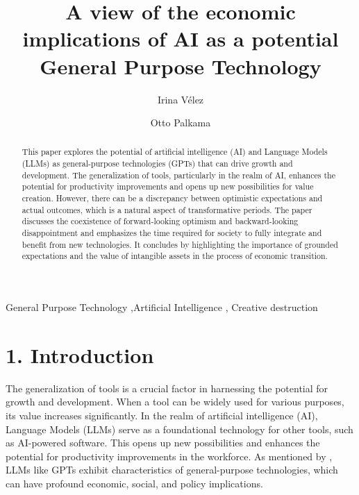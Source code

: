 \documentclass[preprint, 3p,
authoryear]{elsarticle} %
\begin{document}
\begin{frontmatter}

  \title{A view of the economic implications of AI as a potential
General Purpose Technology}
    \author[University of Helsinki]{Irina Vélez%
  }
    \author[Aalto University]{Otto Palkama%
  }
  
  \begin{abstract}
  This paper explores the potential of artificial intelligence (AI) and
  Language Models (LLMs) as general-purpose technologies (GPTs) that can
  drive growth and development. The generalization of tools,
  particularly in the realm of AI, enhances the potential for
  productivity improvements and opens up new possibilities for value
  creation. However, there can be a discrepancy between optimistic
  expectations and actual outcomes, which is a natural aspect of
  transformative periods. The paper discusses the coexistence of
  forward-looking optimism and backward-looking disappointment and
  emphasizes the time required for society to fully integrate and
  benefit from new technologies. It concludes by highlighting the
  importance of grounded expectations and the value of intangible assets
  in the process of economic transition.
  \end{abstract}
    \begin{keyword}
    General Purpose Technology \sep Artificial Intelligence \sep 
    Creative destruction
  \end{keyword}
  
 \end{frontmatter}

\hypertarget{introduction}{%
\section{1. Introduction}\label{introduction}}

The generalization of tools is a crucial factor in harnessing the
potential for growth and development. When a tool can be widely used for
various purposes, its value increases significantly. In the realm of
artificial intelligence (AI), Language Models (LLMs) serve as a
foundational technology for other tools, such as AI-powered software.
This opens up new possibilities and enhances the potential for
productivity improvements in the workforce. As mentioned by
\citep{gptaregpts}, LLMs like GPTs exhibit characteristics of
general-purpose technologies, which can have profound economic, social,
and policy implications.
\end{document}
